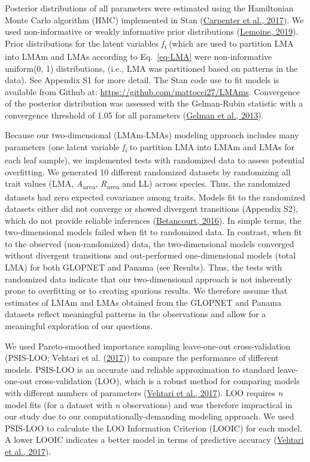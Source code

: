 \documentclass[
  12pt,
  a4paper,
,tablecaptionabove
]{scrartcl}
\begin{document}
Posterior distributions of all parameters were estimated using the
Hamiltonian Monte Carlo algorithm (HMC) implemented in Stan
(\protect\hyperlink{ref-Carpenter2017}{Carpenter et al., 2017}). We used
non-informative or weakly informative prior distributions
(\protect\hyperlink{ref-Lemoine2019}{Lemoine, 2019}). Prior
distributions for the latent variables \emph{f\textsubscript{i}} (which
are used to partition LMA into LMAm and LMAs according to
Eq.~\ref{eq-LMA} were non-informative uniform(0, 1) distributions,
(i.e., LMA was partitioned based on patterns in the data). See Appendix
S1 for more detail. The Stan code use to fit models is available from
Github at: \url{https://github.com/mattocci27/LMAms}. Convergence of the
posterior distribution was assessed with the Gelman-Rubin statistic with
a convergence threshold of 1.05 for all parameters
(\protect\hyperlink{ref-Gelman2013}{Gelman et al., 2013}).

Because our two-dimensional (LMAm-LMAs) modeling approach includes many
parameters (one latent variable \emph{f\textsubscript{i}} to partition
LMA into LMAm and LMAs for each leaf sample), we implemented tests with
randomized data to assess potential overfitting. We generated 10
different randomized datasets by randomizing all trait values (LMA,
\emph{A}\textsubscript{area}, \emph{R}\textsubscript{area} and LL)
across species. Thus, the randomized datasets had zero expected
covariance among traits. Models fit to the randomized datasets either
did not converge or showed divergent transitions (Appendix S2), which do
not provide reliable inferences
(\protect\hyperlink{ref-Betancourt2016}{Betancourt, 2016}). In simple
terms, the two-dimensional models failed when fit to randomized data. In
contrast, when fit to the observed (non-randomized) data, the
two-dimensional models converged without divergent transitions and
out-performed one-dimensional models (total LMA) for both GLOPNET and
Panama (see Results). Thus, the tests with randomized data indicate that
our two-dimensional approach is not inherently prone to overfitting or
to creating spurious results. We therefore assume that estimates of LMAm
and LMAs obtained from the GLOPNET and Panama datasets reflect
meaningful patterns in the observations and allow for a meaningful
exploration of our questions.

We used Pareto-smoothed importance sampling leave-one-out
cross-validation (PSIS-LOO; Vehtari et al.
(\protect\hyperlink{ref-Vehtari2017}{2017})) to compare the performance
of different models. PSIS-LOO is an accurate and reliable approximation
to standard leave-one-out cross-validation (LOO), which is a robust
method for comparing models with different numbers of parameters
(\protect\hyperlink{ref-Vehtari2017}{Vehtari et al., 2017}). LOO
requires \emph{n} model fits (for a dataset with \emph{n} observations)
and was therefore impractical in our study due to our
computationally-demanding modeling approach. We used PSIS-LOO to
calculate the LOO Information Criterion (LOOIC) for each model. A lower
LOOIC indicates a better model in terms of predictive accuracy
(\protect\hyperlink{ref-Vehtari2017}{Vehtari et al., 2017}).
\end{document}
